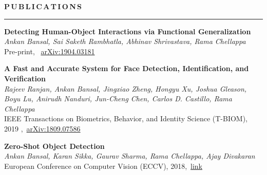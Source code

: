 \documentclass[11pt, a4paper]{article}
\begin{document}
%

\textbf{P\,U\,B\,L\,I\,C\,A\,T\,I\,O\,N\,S}
\vspace{5pt}
\hrule
\vspace{7pt}

\textbf{Detecting Human-Object Interactions via Functional Generalization}\\
\textit{Ankan Bansal, Sai Saketh Rambhatla, Abhinav Shrivastava, Rama Chellappa}\\
Pre-print, ~\href{https://arxiv.org/abs/1904.03181}{arXiv:1904.03181}

\vspace{3pt}

\textbf{A Fast and Accurate System for Face Detection, Identification, and Verification} \\
\textit{Rajeev Ranjan, Ankan Bansal, Jingxiao Zheng, Hongyu Xu, Joshua Gleason, Boyu Lu, Anirudh
Nanduri, Jun-Cheng Chen, Carlos D. Castillo, Rama Chellappa}\\
IEEE Transactions on Biometrics, Behavior, and Identity Science (T-BIOM), 2019 ,~\href{https://arxiv.org/abs/1809.07586}{arXiv:1809.07586}

\vspace{3pt}

\textbf{Zero-Shot Object Detection}\\
\textit{Ankan Bansal, Karan Sikka, Gaurav Sharma, Rama Chellappa, Ajay Divakaran}\\
European Conference on Computer Vision (ECCV), 2018,~\href{http://openaccess.thecvf.com/content_ECCV_2018/html/Ankan_Bansal_Zero-Shot_Object_Detection_ECCV_2018_paper.html}{link}
\end{document}
